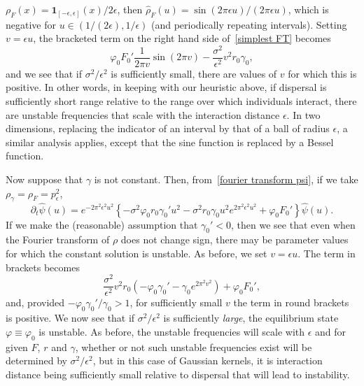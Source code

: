 \documentclass[12pt]{article}
\def \hat{\widehat}
\numberwithin{equation}{section}
\begin{document}
$\rho_F(x)={\mathbf 1}_{[-\epsilon, \epsilon]}(x)/2\epsilon$, then 
$\hat{\rho}_F(u)=\sin (2\pi\epsilon u)/(2\pi\epsilon u)$, which is 
negative for $u\in (1/(2\epsilon), 1/\epsilon)$ (and periodically 
repeating intervals). Setting $v=\epsilon u$, the bracketed term on 
the right hand side of~\eqref{simplest FT} becomes 
\[
	\varphi_0F_0'\frac{1}{2\pi v}\sin (2\pi v)
	-\frac{\sigma^2}{\epsilon^2}v^2r_0\gamma_0,
\]
and we see that if $\sigma^2/\epsilon^2$ is sufficiently small, there are
values of $v$ for which this is positive. In other words, in keeping
with our heuristic above, if dispersal is sufficiently short range relative to
the range over which individuals interact, there are unstable frequencies that
scale with the interaction distance $\epsilon$. In two dimensions, replacing 
the indicator of an interval by that of a ball of radius $\epsilon$, a
similar analysis applies, except that the sine function is replaced by a 
Bessel function.

Now suppose that $\gamma$ is not constant. Then, 
from~\eqref{fourier transform psi},
if we take 
$\rho_\gamma=\rho_F=p_\epsilon^2$,
\begin{equation*}
	\partial_t \hat \psi(u) = e^{-2\pi^2\epsilon^2 u^2 } 
	\left\{
		-\sigma^2\varphi_0 r_0\gamma_0'u^2
	-\sigma^2r_0\gamma_0u^2e^{2\pi^2\epsilon^2u^2}
	+\varphi_0 F_0'
	\right\}
	\hat{\psi}(u).
\end{equation*}
If we make the (reasonable)
assumption that $\gamma_0'<0$, then we see that even when the Fourier
transform of $\rho$ does not change sign, there may be parameter values
for which the constant solution is unstable.
As before, we set $v=\epsilon u$. The term in brackets becomes
\[
	\frac{\sigma^2}{\epsilon^2}v^2 r_0 \left(-\varphi_0 \gamma_0' - \gamma_0 e^{2\pi^2v^2}\right)+\varphi_0F_0',
\] 
and, provided $-\varphi_0\gamma_0'/\gamma_0>1$, for sufficiently small $v$ 
the term in round brackets is positive. We now see that if 
$\sigma^2/\epsilon^2$ is sufficiently {\em large},
the equilibrium state $\varphi\equiv\varphi_0$ 
is unstable. As before, the unstable frequencies will scale with $\epsilon$
and for given $F$, $r$ and $\gamma$, whether or not such unstable
frequencies exist will be determined by $\sigma^2/\epsilon^2$, but 
in this case of Gaussian kernels, 
it is interaction distance being sufficiently small relative
to dispersal that will lead to instability.
	
\end{document}
